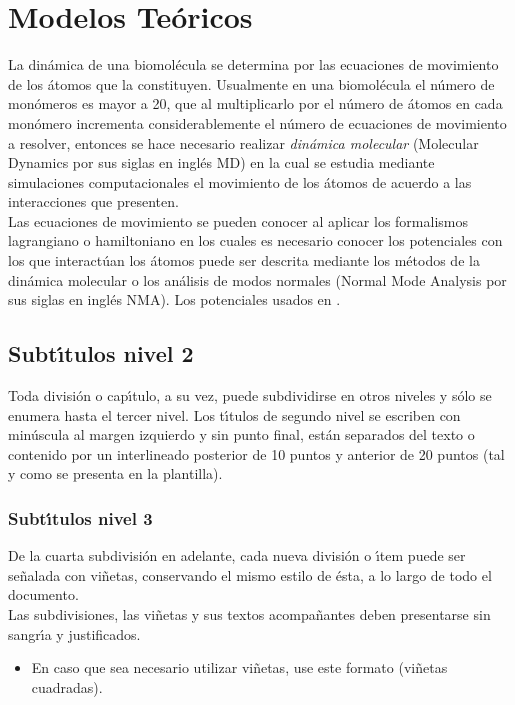 \chapter{Modelos Te\'{o}ricos}
La din\'{a}mica de una biomol\'{e}cula se determina por las ecuaciones de movimiento de los \'{a}tomos que la constituyen. Usualmente en una biomol\'{e}cula el n\'{u}mero de mon\'{o}meros es mayor a 20, que al multiplicarlo por el n\'{u}mero de \'{a}tomos en cada mon\'{o}mero incrementa considerablemente el n\'{u}mero de ecuaciones de movimiento a resolver, entonces se hace necesario realizar \textit{din\'{a}mica molecular} (Molecular Dynamics por sus siglas en ingl\'{e}s MD) en la cual se estudia mediante simulaciones computacionales el movimiento de los \'{a}tomos de acuerdo a las interacciones que presenten.\\

Las ecuaciones de movimiento se pueden conocer al aplicar los formalismos lagrangiano o hamiltoniano en los cuales es necesario conocer los potenciales con los que interact\'{u}an los \'{a}tomos puede ser descrita mediante los m\'{e}todos de la din\'{a}mica molecular o los an\'{a}lisis de modos normales (Normal Mode Analysis por sus siglas en ingl\'{e}s NMA). Los potenciales usados en \cite{G1,AG09b}.

\section{Subt\'{\i}tulos nivel 2}
Toda divisi\'{o}n o cap\'{\i}tulo, a su vez, puede subdividirse en otros niveles y s\'{o}lo se enumera hasta el tercer nivel. Los t\'{\i}tulos de segundo nivel se escriben con min\'{u}scula al margen izquierdo y sin punto final, est\'{a}n separados del texto o contenido por un interlineado posterior de 10 puntos y anterior de 20 puntos (tal y como se presenta en la plantilla).\\

\subsection{Subt\'{\i}tulos nivel 3}
De la cuarta subdivisi\'{o}n en adelante, cada nueva divisi\'{o}n o \'{\i}tem puede ser se\~{n}alada con vi\~{n}etas, conservando el mismo estilo de \'{e}sta, a lo largo de todo el documento.\\

Las subdivisiones, las vi\~{n}etas y sus textos acompa\~{n}antes deben presentarse sin sangr\'{\i}a y justificados.\\

\begin{itemize}
\item En caso que sea necesario utilizar vi\~{n}etas, use este formato (vi\~{n}etas cuadradas).
\end{itemize}